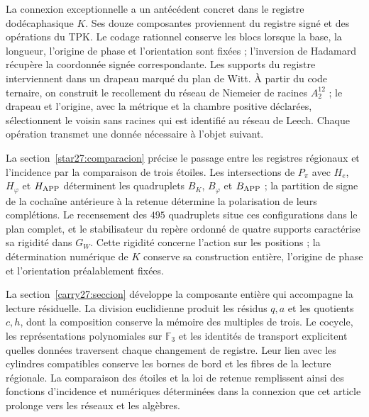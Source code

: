 La connexion exceptionnelle a un antécédent concret dans le registre
dodécaphasique \(K\). Ses douze composantes proviennent du registre signé
et des opérations du TPK. Le codage rationnel conserve les
blocs lorsque la base, la longueur, l’origine de phase et l’orientation sont fixées ;
l’inversion de Hadamard récupère la coordonnée signée correspondante.
Les supports du registre interviennent dans un drapeau marqué du plan
de Witt. À partir du code ternaire, on construit le recollement du réseau
de Niemeier de racines \(A_2^{12}\) ; le drapeau et l’origine, avec la
métrique et la chambre positive déclarées, sélectionnent le voisin sans
racines qui est identifié au réseau de Leech. Chaque opération
transmet une donnée nécessaire à l’objet suivant.

La section~\ref{star27:comparacion} précise le passage entre les registres
régionaux et l’incidence par la comparaison de trois étoiles.
Les intersections de \(P_\pi\) avec \(H_e\), \(H_\varphi\) et
\(H_{\rm APP}\) déterminent les quadruplets \(B_K\), \(B_\varphi\) et
\(B_{\rm APP}\) ; la partition de signe de la cochaîne antérieure à la
retenue détermine la polarisation de leurs complétions. Le recensement des
\(495\) quadruplets situe ces configurations dans le plan complet,
et le stabilisateur du repère ordonné de quatre supports caractérise
sa rigidité dans \(G_W\). Cette rigidité concerne l’action sur les
positions ; la détermination numérique de \(K\) conserve sa construction
entière, l’origine de phase et l’orientation préalablement fixées.

La section~\ref{carry27:seccion} développe la composante entière qui
accompagne la lecture résiduelle. La division euclidienne produit les
résidus \(q,a\) et les quotients \(c,h\), dont la composition conserve la
mémoire des multiples de trois. Le cocycle, les représentations
polynomiales sur \(\mathbb F_3\) et les identités de transport
explicitent quelles données traversent chaque changement de registre. Leur lien avec
les cylindres compatibles conserve les bornes de bord et les fibres
de la lecture régionale. La comparaison des étoiles et la loi de
retenue remplissent ainsi des fonctions d’incidence et numériques déterminées
dans la connexion que cet article prolonge vers les réseaux et les algèbres.



